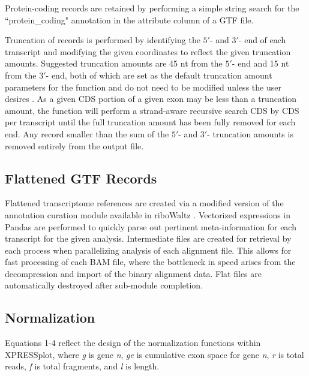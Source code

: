 \documentclass[10pt, oneside]{article}
\begin{document}
Protein-coding records are retained by performing a simple string search for the ``protein\_coding" annotation in the attribute column of a GTF file. \par

Truncation of records is performed by identifying the $5'$- and $3'$- end of each transcript and modifying the given coordinates to reflect the given truncation amounts. Suggested truncation amounts are 45 nt from the $5'$- end and 15 nt from the $3'$- end, both of which are set as the default truncation amount parameters for the function and do not need to be modified unless the user desires \cite{ingolia_meth}. As a given CDS portion of a given exon may be less than a truncation amount, the function will perform a strand-aware recursive search CDS by CDS per transcript until the full truncation amount has been fully removed for each end. Any record smaller than the sum of the $5'$- and $3'$- truncation amounts is removed entirely from the output file. \par

\subsection{Flattened GTF Records}
Flattened transcriptome references are created via a modified version of the annotation curation module available in riboWaltz \cite{ribowaltz}. Vectorized expressions in Pandas \cite{pandas} are performed to quickly parse out pertinent meta-information for each transcript for the given analysis. Intermediate files are created for retrieval by each process when parallelizing analysis of each alignment file. This allows for fast processing of each BAM file, where the bottleneck in speed arises from the decompression and import of the binary alignment data. Flat files are automatically destroyed after sub-module completion. \par

\subsection{Normalization}
Equations 1-4 reflect the design of the normalization functions within XPRESSplot, where \textit{g} is gene \textit{n}, \textit{ge} is cumulative exon space for gene \textit{n}, \textit{r} is total reads, \textit{f} is total fragments, and \textit{l} is length.
\end{document}
